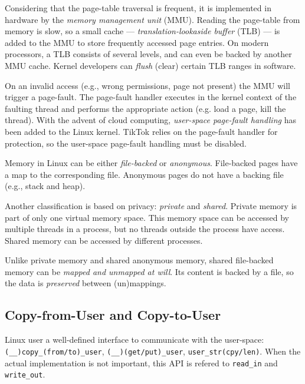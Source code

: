 \documentclass[conference]{IEEEtran}
\newcommand{\sysname}{TikTok}
\begin{document}
Considering that the page-table traversal is frequent, it is implemented in
hardware by the \emph{memory management unit} (MMU). Reading the page-table from
memory is slow, so a small cache --- \emph{translation-lookaside buffer} (TLB)
--- is added to the MMU to store frequently accessed page entries. On modern
processors, a TLB consists of several levels, and can even be backed by another
MMU cache. Kernel developers can \emph{flush} (clear) certain TLB ranges in
software.

On an invalid access (e.g., wrong permissions, page not present) the MMU will
trigger a page-fault. The page-fault handler executes in the kernel context of
the faulting thread and performs the appropriate action (e.g. load a page, kill
the thread). With the advent of cloud computing, \emph{user-space page-fault
handling} has been added to the Linux kernel. \sysname{} relies on the page-fault
handler for protection, so the user-space page-fault handling must be disabled.

Memory in Linux can be either \emph{file-backed} or \emph{anonymous}.
File-backed pages have a map to the corresponding file. Anonymous pages do not
have a backing file (e.g., stack and heap).

Another classification is based on privacy: \emph{private} and \emph{shared}. 
Private memory is part of only one virtual memory space. This memory space can 
be accessed by multiple threads in a process, but no threads outside the process
have access. Shared memory can be accessed by different processes.

Unlike private memory and shared anonymous memory, shared file-backed memory can
be \emph{mapped and unmapped at will}. Its content is backed by a file, so the
data is \emph{preserved} between (un)mappings.

\subsection{Copy-from-User and Copy-to-User}
\label{subsec:copy}

Linux user a well-defined interface to communicate with the user-space:
\texttt{(\_\_)copy\_(from/to)\_user}, \texttt{(\_\_)(get/put)\_user},
\texttt{user\_str(cpy/len)}. When the actual implementation is not important,
this API is refered to \texttt{read\_in} and \texttt{write\_out}.
\end{document}
